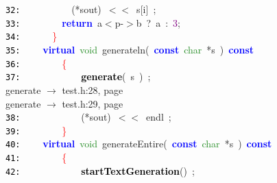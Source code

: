 \documentclass{article}
\begin{document}
\mbox{}\texttt{\textcolor{Black}{32:}} \ \ \ \ \ \ \ \ \ \ \textcolor{BrickRed}{(*}sout\textcolor{BrickRed}{)}\ \textcolor{BrickRed}{$<$$<$}\ s\textcolor{BrickRed}{[}i\textcolor{BrickRed}{]}\ \textcolor{BrickRed}{;} \\
\mbox{}\texttt{\textcolor{Black}{33:}} \ \ \ \ \ \ \ \ \textbf{\textcolor{Blue}{return}}\ a\textcolor{BrickRed}{$<$}p\textcolor{BrickRed}{-$>$}b\ \textcolor{BrickRed}{?}\ a\ \textcolor{BrickRed}{:}\ \textcolor{Purple}{3}\textcolor{BrickRed}{;} \\
\mbox{}\texttt{\textcolor{Black}{34:}} \ \ \ \ \ \ \textcolor{Red}{\}} \\
\mbox{}\texttt{\textcolor{Black}{35:}} \ \ \ \ \textbf{\textcolor{Blue}{virtual}}\ \textcolor{ForestGreen}{void}\ \label{test.h:35}generateln\textcolor{BrickRed}{(}\ \textbf{\textcolor{Blue}{const}}\ \textcolor{ForestGreen}{char}\ \textcolor{BrickRed}{*}s\ \textcolor{BrickRed}{)}\ \textbf{\textcolor{Blue}{const}} \\
\mbox{}\texttt{\textcolor{Black}{36:}} \ \ \ \ \ \ \ \ \textcolor{Red}{\{}\  \\
\mbox{}\texttt{\textcolor{Black}{37:}} \ \ \ \ \ \ \ \ \ \ \ \ \textbf{\textcolor{Black}{generate}}\textcolor{BrickRed}{(}\ s\ \textcolor{BrickRed}{)}\ \textcolor{BrickRed}{;} \\
\mbox{}{\hfill generate $\rightarrow$ test.h:28, page~\pageref{test.h:28}} \\
\mbox{}{\hfill generate $\rightarrow$ test.h:29, page~\pageref{test.h:29}} \\
\mbox{}\texttt{\textcolor{Black}{38:}} \ \ \ \ \ \ \ \ \ \ \ \ \textcolor{BrickRed}{(*}sout\textcolor{BrickRed}{)}\ \textcolor{BrickRed}{$<$$<$}\ endl\ \textcolor{BrickRed}{;}\  \\
\mbox{}\texttt{\textcolor{Black}{39:}} \ \ \ \ \ \ \ \ \textcolor{Red}{\}} \\
\mbox{}\texttt{\textcolor{Black}{40:}} \ \ \ \ \textbf{\textcolor{Blue}{virtual}}\ \textcolor{ForestGreen}{void}\ \label{test.h:40}generateEntire\textcolor{BrickRed}{(}\ \textbf{\textcolor{Blue}{const}}\ \textcolor{ForestGreen}{char}\ \textcolor{BrickRed}{*}s\ \textcolor{BrickRed}{)}\ \textbf{\textcolor{Blue}{const}} \\
\mbox{}\texttt{\textcolor{Black}{41:}} \ \ \ \ \ \ \ \ \textcolor{Red}{\{} \\
\mbox{}\texttt{\textcolor{Black}{42:}} \ \ \ \ \ \ \ \ \ \ \ \ \textbf{\textcolor{Black}{startTextGeneration}}\textcolor{BrickRed}{()}\ \textcolor{BrickRed}{;} \\
\end{document}
